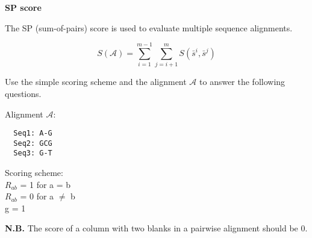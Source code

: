 \question \textbf{SP score}

The SP (sum-of-pairs) score is used to evaluate multiple sequence alignments.
 
\[
S(\mathcal{A}) = \sum_{i=1}^{m-1} \sum_{j=i+1}^{m} S(\bar{s}^i, \bar{s}^j)
\]

Use the simple scoring scheme and the alignment $\mathcal{A}$ to answer the following questions.

\begin{multicols}{2}
Alignment $\mathcal{A}$:
\begin{verbatim}
  Seq1: A-G
  Seq2: GCG
  Seq3: G-T
\end{verbatim}
\vfill\null
\columnbreak

\noindent Scoring scheme: \\ 
\null \quad $R_{ab}$ = 1 for a = b \\ 
\null \quad $R_{ab}$ = 0 for a $\neq$ b \\ 
\null \quad g = 1

\end{multicols} 

\textbf{N.B.} The score of a column with two blanks in a pairwise alignment should be 0.

\vspace{0.1 in}


